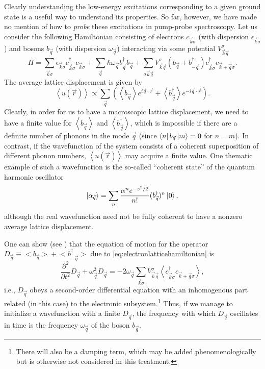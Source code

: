 Clearly understanding the low-energy excitations corresponding to a given ground state is a useful way to understand its properties.
So far, however, we have made no mention of how to \emph{probe} these excitations in pump-probe spectroscopy.
Let us consider the following Hamiltonian consisting of electrons $c_{\vec{k}\sigma}$ (with dispersion $\epsilon_{\vec{k}\sigma}$) and bosons $b_{\vec{q}}$ (with dispersion $\omega_{\vec{q}}$) interacting via some potential $V^\sigma_{\vec{k}\vec{q}}$
\begin{equation}\label{eq:electronlatticehamiltonian}
H = \sum_{\vec{k}\sigma}\epsilon_{\vec{k}\sigma}c^\dagger_{\vec{k}\sigma}c_{\vec{k}\sigma}
+\sum_{\vec{q}}\hbar \omega_{\vec{q}}b^\dagger_{\vec{q}}b_{\vec{q}}
+\sum_{\sigma\vec{k}\vec{q}}V^\sigma_{\vec{k}\vec{q}}\left(b_{\vec{q}}+b^\dagger_{-\vec{q}}\right)c^\dagger_{\vec{k}\sigma}c_{\vec{k}+\vec{q}\sigma}.
\end{equation}
The average lattice displacement is given by
\begin{equation}
\left<u(\vec{r})\right> \propto \sum_{\vec{q}}\left(\left<b_{\vec{q}}\right>e^{i\vec{q}\cdot\vec{r}}+\left<b^\dagger_{\vec{q}}\right>e^{-i\vec{q}\cdot\vec{r}}\right).
\end{equation}
Clearly, in order for us to have a macroscopic lattice displacement, we need to have a finite value for $\left<b_{\vec{q}}\right>$ and $\left<b^\dagger_{\vec{q}}\right>$, which is impossible if there are a definite number of phonons in the mode $\vec{q}$ (since $\bra{n}b_{\vec{q}}\ket{m}=0$ for $n=m$).
In contrast, if the wavefunction of the system consists of a coherent superposition of different phonon numbers, $\left<u(\vec{r})\right>$ may acquire a finite value.
One thematic example of such a wavefunction is the so-called ``coherent state'' of the quantum harmonic oscillator
\begin{equation}\label{eq:coherentstate}
\ket{\alpha_{\vec{q}}} = \sum_n \frac{\alpha^ne^{-z^2/2}}{n!}(b^\dagger_{\vec{q}})^n\ket{0},
\end{equation}
although the real wavefunction need not be fully coherent to have a nonzero average lattice displacement.

One can show (see \citet{kuznetsov_theory_1994}) that the equation of motion for the operator $D_{\vec{q}}\equiv \big<b_{\vec{q}}\big>+\big<b^\dagger_{-\vec{q}}\big>$ due to \cref{eq:electronlatticehamiltonian} is
\begin{equation}\label{eq:coherentoscillationwaveequation}
\frac{\partial^2}{\partial t^2}D_{\vec{q}}+\omega^2_{\vec{q}}D_{\vec{q}} = -2\omega_{\vec{q}}\sum_{\vec{k}\sigma}V^\sigma_{\vec{k}\vec{q}}\left<c^\dagger_{\vec{k}\sigma} c_{\vec{k}+\vec{q}\sigma}\right>,
\end{equation}
i.e., $D_{\vec{q}}$ obeys a second-order differential equation with an inhomogenous part related (in this case) to the electronic subsystem.\footnote{There will also be a damping term, which may be added phenomenologically but is otherwise not considered in this treatment.}
Thus, if we manage to initialize a wavefunction with a finite $D_{\vec{q}}$, the frequency with which $D_{\vec{q}}$ oscillates in time is the frequency $\omega_{\vec{q}}$ of the boson $b_{\vec{q}}$.

